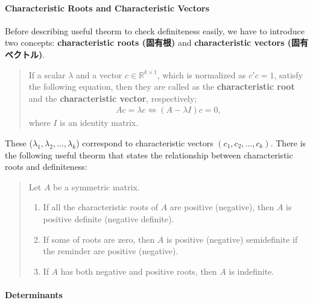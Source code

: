 \documentclass[
  12pt,
]{article}
\providecommand{\tightlist}{%
  \setlength{\itemsep}{0pt}\setlength{\parskip}{0pt}}
\begin{document}
\hypertarget{characteristic-roots-and-characteristic-vectors}{%
\paragraph{Characteristic Roots and Characteristic Vectors}\label{characteristic-roots-and-characteristic-vectors}}

Before describing useful theorm to check definiteness easily,
we have to introduce two concepts: \textbf{characteristic roots (固有根)} and \textbf{characteristic vectors (固有ベクトル)}.

\begin{quote}
If a scalar \(\lambda\) and a vector \(c\in \mathbb{R}^{k \times 1}\), which is normalized as \(c'c=1\), satisfy the following equation, then they are called as the \textbf{characteristic root} and the \textbf{characteristic vector}, respectively;
\begin{align*}
Ac=\lambda c \Leftrightarrow (A-\lambda I)c = 0,
\end{align*}
where \(I\) is an identity matrix.
\end{quote}

These (\(\lambda_1,\lambda _2,...,\lambda _k\)) correspond to characteristic vectors \((c_1, c_2, \dots ,c_k)\).
There is the following useful theorm that states the relationship between characteristic roots and definiteness:

\begin{quote}
Let \(A\) be a symmetric matrix.

\begin{enumerate}
\def\labelenumi{\arabic{enumi}.}
\tightlist
\item
  If all the characteristic roots of \(A\) are positive (negative), then \(A\) is positive definite (negative definite).
\item
  If some of roots are zero, then \(A\) is positive (negative) semidefinite if the reminder are positive (negative).
\item
  If \(A\) has both negative and positive roots, then \(A\) is indefinite.
\end{enumerate}
\end{quote}

\hypertarget{determinants}{%
\paragraph{Determinants}\label{determinants}}
\end{document}
